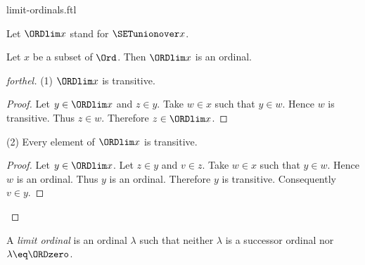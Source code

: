 \documentclass{naproche-library}
\begin{document}
\begin{smodule}[title=Limit Ordinals]{limit-ordinals.ftl}

\begin{convention}[forthel]
  Let $\ORDlim x$ stand for $\SETunionover x$.
\end{convention}

\begin{proposition}[forthel,id=SET_THEORY_02_7202164443185152]
  Let $x$ be a subset of $\Ord$.
  Then $\ORDlim x$ is an ordinal.
\end{proposition}
\begin{proof}[forthel]
  (1) $\ORDlim x$ is transitive.
  \begin{proof}
    Let $y \in \ORDlim x$ and $z \in y$.
    Take $w \in x$ such that $y \in w$.
    Hence $w$ is transitive.
    Thus $z \in w$.
    Therefore $z \in \ORDlim x$.
  \end{proof}

  (2) Every element of $\ORDlim x$ is transitive.
  \begin{proof}
    Let $y \in \ORDlim x$.
    Let $z \in y$ and $v \in z$.
    Take $w \in x$ such that $y \in w$.
    Hence $w$ is an ordinal.
    Thus $y$ is an ordinal.
    Therefore $y$ is transitive.
    Consequently $v \in y$.
  \end{proof}
\end{proof}

\begin{definition}[forthel,id=SET_THEORY_02_7678388934279168]
  A \emph{limit ordinal} is an ordinal $\lambda$ such that neither $\lambda$ is a successor ordinal nor $\lambda \eq \ORDzero$.
\end{definition}
\end{smodule}
\end{document}
